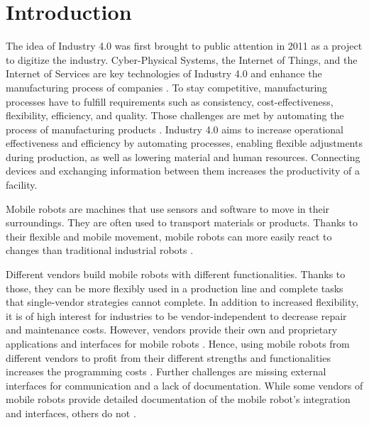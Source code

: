 \chapter{Introduction}
\label{cha:introduction}



The idea of Industry 4.0 was first brought to public attention in 2011 as a project to digitize the industry. Cyber-Physical Systems, the Internet of Things, and the Internet of Services are key technologies of Industry 4.0 and enhance the manufacturing process of companies \cite{quadrini_open_2020}. To stay competitive, manufacturing processes have to fulfill requirements such as consistency, cost-effectiveness, flexibility, efficiency, and quality. Those challenges are met by automating the process of manufacturing products \cite{sharma_management_2017, krzhizhanovskaya_autonomous_2020, andreasson_autonomous_2015}. Industry 4.0 aims to increase operational effectiveness and efficiency by automating processes, enabling flexible adjustments during production, as well as lowering material and human resources. Connecting devices and exchanging information between them increases the productivity of a facility.

Mobile robots are machines that use sensors and software to move in their surroundings. They are often used to transport materials or products. Thanks to their flexible and mobile movement, mobile robots can more easily react to changes than traditional industrial robots \cite{krzhizhanovskaya_autonomous_2020, gunthner_internet_2010}. 

Different vendors build mobile robots with different functionalities. Thanks to those, they can be more flexibly used in a production line and complete tasks that single-vendor strategies cannot complete. In addition to increased flexibility, it is of high interest for industries to be vendor-independent to decrease repair and maintenance costs. However, vendors provide their own and proprietary applications and interfaces for mobile robots \cite{sanneman_state_2020}. Hence, using mobile robots from different vendors to profit from their different strengths and functionalities increases the programming costs \cite{lambrecht_control_2011}. Further challenges are missing external interfaces for communication and a lack of documentation. While some vendors of mobile robots provide detailed documentation of the mobile robot’s integration and interfaces, others do not \cite{jepsen_pilot_2020}.


